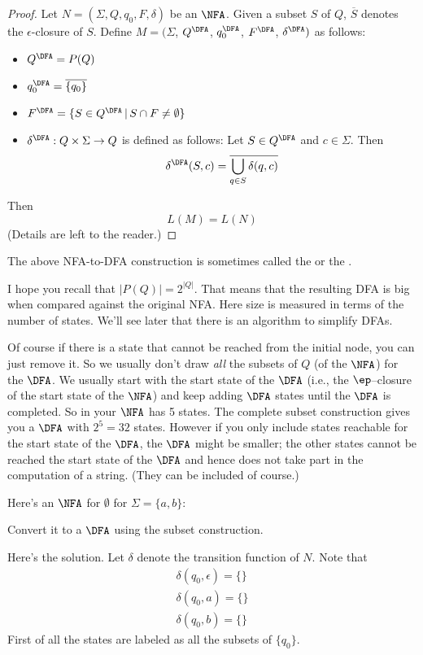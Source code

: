 \begin{proof}
Let $N = (\Sigma, Q, q_0, F, \delta)$ be an $\NFA$. 
Given a subset $S$ of $Q$, $\overline{S}$ denotes the $\epsilon$-closure
of $S$.
Define $M =
(\Sigma$, $Q^{\DFA}$, $q_0^{\DFA}$, $F^{\DFA}$, $\delta^{\DFA})$ as
follows: 
 \begin{itemize}
 \item $Q^{\DFA} = P(Q)$
 \item $q_0^{\DFA} = \overline{\{q_0\}}$
 \item $F^{\DFA} = \{ S \in Q^{\DFA} \,|\, S \cap F \neq \emptyset \}$
 \item $\delta^{\DFA} : Q \times \Sigma \rightarrow Q$ is defined as
 follows: Let $S \in Q^{\DFA}$ and $c \in \Sigma$. Then
 \[
   \delta^{\DFA}(S,c) = \overline{\bigcup_{q \in S} \delta(q,c)}
 \]
 \end{itemize}
Then 
\[
L(M) = L(N)
\]
(Details are left to the reader.)
\end{proof}

The above NFA-to-DFA construction is sometimes called the
 or the
\tinysidebarskip{}\sidebarskip{0pt}.


I hope you recall that $|P(Q)| = 2^{|Q|}$. 
That means that the
resulting DFA is big when compared against the original NFA. 
Here size is measured in terms of the
number of states. We'll see later that there is an algorithm to
simplify DFAs.

Of course if there is a state that cannot be reached from the initial
node, you can just remove it. 
So we usually don't draw \textit{all} the subsets of $Q$ (of the $\NFA$)
for the $\DFA$. 
We usually start with the start state of the $\DFA$ 
(i.e., the $\ep$--closure of the start state of the $\NFA$)
and keep adding $\DFA$ states until the $\DFA$ is completed.
So in your $\NFA$ has 5 states.
The complete subset construction gives you a $\DFA$ with $2^5 = 32$ states.
However if you only include states reachable for the start state
of the $\DFA$, the $\DFA$ might be smaller;
the other states cannot be reached the start state of the $\DFA$
and hence does not take part in the computation of a string.
(They can be included of course.)


Here's an $\NFA$ for $\emptyset$ for $\Sigma = \{a,b\}$:

Convert it to a $\DFA$ using the subset construction.

Here's the solution.
Let $\delta$ denote the transition function of $N$.
Note that 
\begin{align*}
  \delta(q_0, \epsilon) = \{\} \\
  \delta(q_0, a) = \{\} \\
  \delta(q_0, b) = \{\} 
\end{align*}
First of all the states are labeled as all the subsets of $\{q_0\}$.


